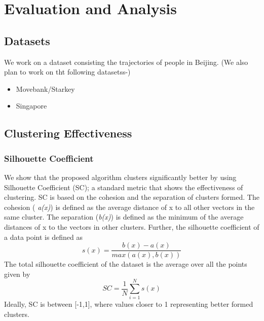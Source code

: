 \section{Evaluation and Analysis}

\subsection{Datasets}
We work on a dataset consisting the trajectories of people in Beijing. (We also plan to work on tht following datasetss-)
\begin{itemize}
\item Movebank/Starkey
\item Singapore
\end{itemize}



\subsection{Clustering Effectiveness}

\subsubsection{Silhouette Coefficient}
We show that the proposed algorithm clusters significantly better by using Silhouette Coefficient (SC); a standard metric that shows the effectiveness of clustering. SC is based on the cohesion and the separation of clusters formed. The cohesion ( \textit{a(x)})  is defined as the average distance of x to all other vectors in the same cluster. 
The separation (\textit{b(x)}) is defined as the minimum of the average distances of x to the vectors in other clusters.
Further, the silhouette coefficient of a data point is defined as 
\begin{equation}
s(x)=\frac{b(x)-a(x)}{max(a(x),b(x))}
\end{equation}
The total silhouette coefficient of the dataset is the average over all the points given by
\begin{equation}
SC=\frac{1}{N}\sum_{i=1}^{N}s(x)
\end{equation}
\noindent Ideally, SC is between [-1,1], where values closer to 1 representing better formed clusters. 

